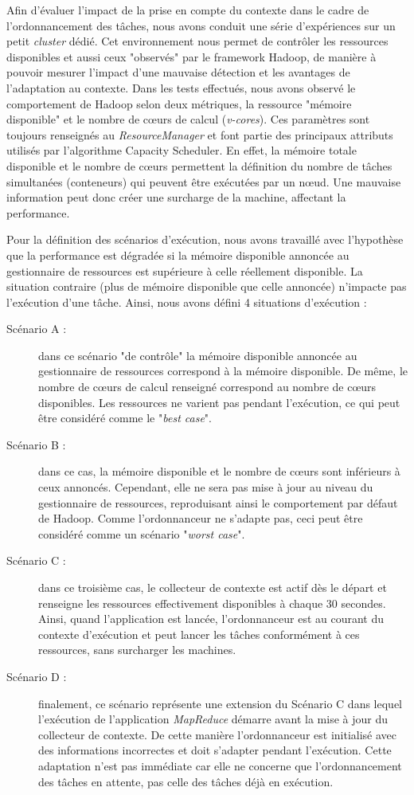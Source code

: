 Afin d'évaluer l'impact de la prise en compte du contexte dans le cadre de l'ordonnancement des tâches, nous avons conduit une série d'expériences sur un petit \textit{cluster} dédié. Cet environnement nous permet de contrôler les ressources disponibles et aussi ceux "observés" par le framework Hadoop, de manière à pouvoir mesurer l'impact d'une mauvaise détection et les avantages de l'adaptation au contexte. Dans les tests effectués, nous avons observé le comportement de Hadoop selon deux métriques, la ressource "mémoire disponible" et le nombre de c{\oe}urs de calcul (\textit{v-cores}). Ces paramètres sont toujours renseignés au \textit{ResourceManager} et font partie des principaux attributs utilisés par l'algorithme Capacity Scheduler. En effet, la mémoire totale disponible et le nombre de c{\oe}urs permettent la définition du nombre de tâches simultanées (conteneurs) qui peuvent être exécutées par un n{\oe}ud. Une mauvaise information peut donc créer une surcharge de la machine, affectant la performance.  

Pour la définition des scénarios d'exécution, nous avons travaillé avec l'hypothèse que la performance est dégradée si la mémoire disponible annoncée au gestionnaire de ressources est supérieure à celle réellement disponible. La situation contraire (plus de mémoire disponible que celle annoncée) n'impacte pas l'exécution d'une tâche. Ainsi, nous avons défini 4 situations d'exécution :

\begin{description}
	\item[Scénario A :] dans ce scénario "de contrôle" la mémoire disponible annoncée au gestionnaire de ressources correspond à la mémoire disponible. De même, le nombre de c{\oe}urs de calcul renseigné correspond au nombre de c{\oe}urs disponibles. Les ressources ne varient pas pendant l'exécution, ce qui peut être considéré comme le "\textit{best case}". 
	\item[Scénario B :] dans ce cas, la mémoire disponible et le nombre de c{\oe}urs sont inférieurs à ceux annoncés. Cependant, elle ne sera pas mise à jour au niveau du gestionnaire de ressources, reproduisant ainsi le comportement par défaut de Hadoop. Comme l'ordonnanceur ne s'adapte pas, ceci peut être considéré comme un scénario "\textit{worst case}".
	\item[Scénario C :] dans ce troisième cas, le collecteur de contexte est actif dès le départ et renseigne les ressources effectivement disponibles à chaque 30 secondes. Ainsi, quand l'application est lancée, l'ordonnanceur est au courant du contexte d'exécution et peut lancer les tâches conformément à ces ressources, sans surcharger les machines. 
	\item[Scénario D :] finalement, ce scénario représente une extension du Scénario C dans lequel l'exécution de l'application \textit{MapReduce} démarre avant la mise à jour du collecteur de contexte. De cette manière l'ordonnanceur est initialisé avec des informations incorrectes et doit s'adapter pendant l'exécution. Cette adaptation n'est pas immédiate car elle ne concerne que l'ordonnancement des tâches en attente, pas celle des tâches déjà en exécution.
\end{description}


